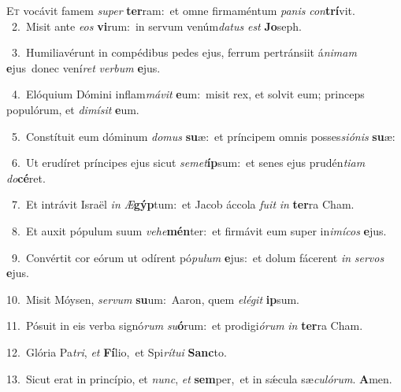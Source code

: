 \lettrine{\initial\textcolor{\initialcolor}{E}}{t} vocávit famem \textit{su}\-\textit{per} \textbf{ter}\-ram:~\star et omne firmaméntum \textit{pa}\-\textit{nis} \textit{con}\-\textbf{trí}vit.\\
{\numbfont\textcolor{\numbcolor}{~2.}}~Misit ante \textit{e}\-\textit{os} \textbf{vi}\-rum:~\star in servum venúm\-\textit{da}\-\textit{tus} \textit{est} \textbf{Jo}\-seph.\par
{\numbfont\textcolor{\numbcolor}{~3.}}~Humiliavérunt in compédibus pedes ejus, ferrum pertránsiit á\-\textit{ni}\-\textit{mam} \textbf{e}\-jus~\star donec vení\textit{ret} \textit{ver}\-\textit{bum} \textbf{e}\-jus.\par
{\numbfont\textcolor{\numbcolor}{~4.}}~Elóquium Dómini inflam\-\textit{má}\-\textit{vit} \textbf{e}\-um:~\star misit rex, et solvit eum; princeps populórum, et \textit{di}\-\textit{mí}\textit{sit} \textbf{e}\-um.\par
{\numbfont\textcolor{\numbcolor}{~5.}}~Constítuit eum dóminum \textit{do}\-\textit{mus} \textbf{su}\-æ:~\star et príncipem omnis posses\-\textit{si}\-\textit{ó}\textit{nis} \textbf{su}\-æ:\par
{\numbfont\textcolor{\numbcolor}{~6.}}~Ut erudíret príncipes ejus sicut \textit{se}\-\textit{met}\textbf{íp}sum:~\star et senes ejus prudén\-\textit{ti}\-\textit{am} \textit{do}\-\textbf{cé}ret.\par
{\numbfont\textcolor{\numbcolor}{~7.}}~Et intrávit Israël \textit{in} \textit{Æ}\-\textbf{gýp}tum:~\star et Jacob áccola \textit{fu}\-\textit{it} \textit{in} \textbf{ter}\-ra Cham.\par
{\numbfont\textcolor{\numbcolor}{~8.}}~Et auxit pópulum suum \textit{ve}\-\textit{he}\textbf{mén}ter:~\star et firmávit eum super in\-\textit{i}\-\textit{mí}\textit{cos} \textbf{e}\-jus.\par
{\numbfont\textcolor{\numbcolor}{~9.}}~Convértit cor eórum ut odírent pó\-\textit{pu}\-\textit{lum} \textbf{e}\-jus:~\star et dolum fácerent \textit{in} \textit{ser}\-\textit{vos} \textbf{e}\-jus.\par
{\numbfont\textcolor{\numbcolor}{10.}}~Misit Móysen, \textit{ser}\-\textit{vum} \textbf{su}\-um:~\star Aaron, quem \textit{e}\-\textit{lé}\textit{git} \textbf{ip}\-sum.\par
{\numbfont\textcolor{\numbcolor}{11.}}~Pósuit in eis verba signó\textit{rum} \textit{su}\-\textbf{ó}rum:~\star et prodigi\-\textit{ó}\-\textit{rum} \textit{in} \textbf{ter}\-ra Cham.\par
{\numbfont\textcolor{\numbcolor}{12.}}~Glória Pa\-\textit{tri}\-, \textit{et} \textbf{Fí}\-lio,~\star et Spi\-\textit{rí}\-\textit{tu}\textit{i} \textbf{Sanc}\-to.\par
{\numbfont\textcolor{\numbcolor}{13.}}~Sicut erat in princípio, et \textit{nunc}\-, \textit{et} \textbf{sem}\-per,~\star et in sǽcula sæ\-\textit{cu}\-\textit{ló}\textit{rum}. \textbf{A}\-men.\par
